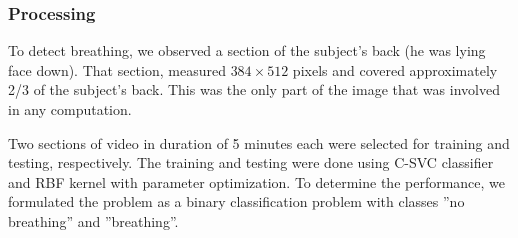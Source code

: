 \subsubsection{Processing}\label{sec:data-preprocessing}
To detect breathing, we observed a section of the subject's back (he was lying face down). That section, measured $384 \times 512$ pixels and covered approximately 2/3 of the subject's back. This was the only part of the image that was involved in any computation. 

Two sections of video in duration of 5 minutes each were selected for training and testing, respectively. The training and testing were done using C-SVC classifier and RBF kernel with parameter optimization. To determine the performance, we formulated the problem as a binary classification problem with classes ''no breathing'' and ''breathing''.

